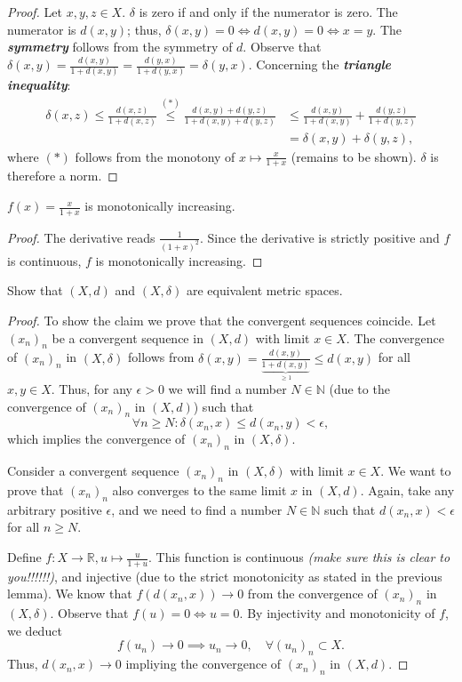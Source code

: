 \documentclass[a4paper]{article}
\renewcommand{\hline}{\noindent\makebox[\linewidth]{\rule{12cm}{1pt}}}
\newcommand{\vip}[1]{\textit{\textbf{#1}}}
\begin{document}
\begin{proof}
Let $x,y,z \in X$. $\delta$ is zero if and only if the numerator is zero. The numerator is $d(x,y)$; thus, $\delta(x,y) = 0 \iff d(x,y) = 0 \iff x = y$. The \vip{symmetry} follows from the {symmetry} of $d$. Observe that $\delta(x,y) = \frac{d(x,y)}{1+d(x,y)} = \frac{d(y,x)}{1+d(y,x)} = \delta(y,x)$. Concerning the \vip{triangle inequality}: 
\begin{align*}
    \delta(x,z) \leq \frac{d(x,z)}{1+d(x,z)} \overset{(*)}{\leq} \frac{d(x,y) + d(y,z)}{1+d(x,y) + d(y,z)} &\leq \frac{d(x,y)}{1+d(x,y)} + \frac{d(y,z)}{1 + d(y,z)} \\
    &= \delta(x,y) + \delta(y,z),
\end{align*}
where $(*)$ follows from the monotony of $x \mapsto \frac{x}{1+x}$ (remains to be shown). $\delta$ is therefore a norm.
\end{proof}

\hline

\begin{lemma}{}{}
$f(x) = \frac{x}{1+x}$ is monotonically increasing.
\end{lemma}

\begin{proof}
The derivative reads $\frac{1}{(1+x)^2}$. Since the derivative is strictly positive and $f$ is continuous, $f$ is monotonically increasing.
\end{proof}

\hline

\begin{issue}{}{}
Show that $(X,d)$ and $(X,\delta)$ are equivalent metric spaces.
\end{issue}

\begin{proof}
To show the claim we prove that the convergent sequences coincide. Let $(x_n)_n$ be a convergent sequence in $(X,d)$ with limit $x \in X$. The convergence of $(x_n)_n$ in $(X, \delta)$ follows from $\delta(x,y) = \frac{d(x,y)}{\underbrace{1+d(x,y)}_{\geq 1}} \leq d(x,y)$ for all $x,y \in X$. Thus, for any $\epsilon > 0$ we will find a number $N \in \mathbb N$ (due to the convergence of $(x_n)_n$ in $(X,d)$) such that 
\[
	\forall n \geq N: \delta(x_n,x) \leq d(x_n,y) < \epsilon,
\]
which implies the convergence of $(x_n)_n$ in $(X, \delta)$.

Consider a convergent sequence $(x_n)_n$ in $(X,\delta)$ with limit $x \in X$. We want to prove that $(x_n)_n$ also converges to the same limit $x$ in $(X,d)$. Again, take any arbitrary positive $\epsilon$, and we need to find a number $N \in \mathbb N$ such that $d(x_n,x) < \epsilon$ for all $n \geq N$. 

Define $f: X \to \mathbb R, u \mapsto \frac{u}{1+u}$. This function is continuous \emph{(make sure this is clear to you!!!!!!)}, and injective (due to the strict monotonicity as stated in the previous lemma). We know that $f(d(x_n,x)) \to 0$ from the convergence of $(x_n)_n$ in $(X,\delta)$. Observe that $f(u) = 0 \iff u = 0$. By injectivity and monotonicity of $f$, we deduct
\[
	f(u_n) \to 0 \implies u_n \to 0, \quad \forall (u_n)_n \subset X.
\]
Thus, $d(x_n,x) \to 0$ impliying the convergence of $(x_n)_n$ in $(X,d)$.
\end{proof}
\end{document}
